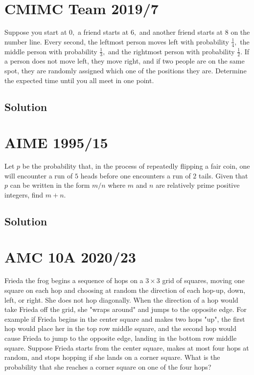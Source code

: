 \documentclass[mast]{lucky}
\begin{document}
\pagebreak\section{CMIMC Team 2019/7} Suppose you start at $0,$ a friend starts at $6,$ and another friend starts at $8$ on the number line. Every second, the leftmost person moves left with probability $\frac{1}{4},$ the middle person with probability $\frac{1}{3},$ and the rightmost person with probability $\frac{1}{2}.$ If a person does not move left, they move right, and if two people are on the same spot, they are randomly assigned which one of the positions they are. Determine the expected time until you all meet in one point.
\subsection{Solution}    




\pagebreak\section{AIME 1995/15} Let $p$ be the probability that, in the process of repeatedly flipping a fair coin, one will encounter a run of $5$ heads before one encounters a run of $2$ tails. Given that $p$ can be written in the form $m/n$ where $m$ and $n$ are relatively prime positive integers, find $m+n$.
\subsection{Solution}

\pagebreak\section{AMC 10A 2020/23}

Frieda the frog begins a sequence of hops on a $3 \times 3$ grid of squares, moving one square on each hop and choosing at random the direction of each hop-up, down, left, or right. She does not hop diagonally. When the direction of a hop would take Frieda off the grid, she "wraps around" and jumps to the opposite edge. For example if Frieda begins in the center square and makes two hops "up", the first hop would place her in the top row middle square, and the second hop would cause Frieda to jump to the opposite edge, landing in the bottom row middle square. Suppose Frieda starts from the center square, makes at most four hops at random, and stops hopping if she lands on a corner square. What is the probability that she reaches a corner square on one of the four hops?
\end{document}
